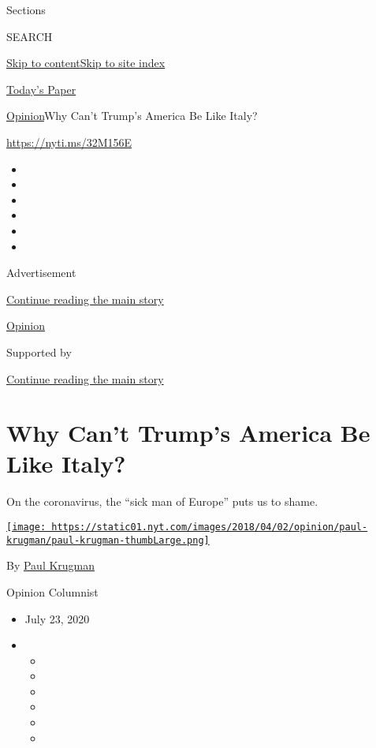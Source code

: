 Sections

SEARCH

\protect\hyperlink{site-content}{Skip to
content}\protect\hyperlink{site-index}{Skip to site index}

\href{https://myaccount.nytimes.com/auth/login?response_type=cookie\&client_id=vi}{}

\href{https://www.nytimes.com/section/todayspaper}{Today's Paper}

\href{/section/opinion}{Opinion}\textbar{}Why Can't Trump's America Be
Like Italy?

\href{https://nyti.ms/32M156E}{https://nyti.ms/32M156E}

\begin{itemize}
\item
\item
\item
\item
\item
\item
\end{itemize}

Advertisement

\protect\hyperlink{after-top}{Continue reading the main story}

\href{/section/opinion}{Opinion}

Supported by

\protect\hyperlink{after-sponsor}{Continue reading the main story}

\hypertarget{why-cant-trumps-america-be-like-italy}{%
\section{Why Can't Trump's America Be Like
Italy?}\label{why-cant-trumps-america-be-like-italy}}

On the coronavirus, the ``sick man of Europe'' puts us to shame.

\href{https://www.nytimes.com/by/paul-krugman}{\texttt{[image: https://static01.nyt.com/images/2018/04/02/opinion/paul-krugman/paul-krugman-thumbLarge.png]}}

By \href{https://www.nytimes.com/by/paul-krugman}{Paul Krugman}

Opinion Columnist

\begin{itemize}
\item
  July 23, 2020
\item
  \begin{itemize}
  \item
  \item
  \item
  \item
  \item
  \item
  \end{itemize}
\end{itemize}


